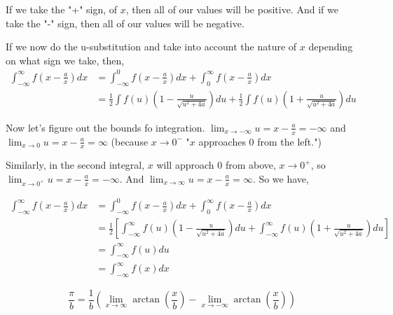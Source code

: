 If we take the "+" sign, of $x$, then all of our values will be positive.
And if we take the "-" sign, then all of our values will be negative.

If we now do the u-substitution and take into account the nature of $x$ depending on what sign we take, then,
\begin{align*}
\int_{-\infty}^{\infty} f\left(x - \frac{a}{x}\right) dx
    &= \int_{-\infty}^{0} f\left(x - \frac{a}{x}\right) dx + \int_{0}^{\infty} f\left(x - \frac{a}{x}\right) dx \\
&= \frac{1}{2} \int f(u) \left(1 - \frac{u}{\sqrt{u^2 + 4a}}\right) du
    + \frac{1}{2} \int f(u) \left(1 + \frac{u}{\sqrt{u^2 + 4a}}\right) du
\end{align*}

Now let's figure out the bounds fo integration.
$\lim_{x\rightarrow -\infty} u = x - \frac{a}{x} = -\infty$ and
$\lim_{x\rightarrow 0} u = x - \frac{a}{x} = \infty$ (because $x\rightarrow 0^-$ "$x$ approaches 0 from the left.")

Similarly, in the second integral, $x$ will approach $0$ from above, $x\rightarrow 0^+$, so
$\lim_{x\rightarrow 0^+} u = x - \frac{a}{x} = -\infty$.
And $\lim_{x\rightarrow \infty} u = x - \frac{a}{x} = \infty$.
So we have,

\begin{align*}
\int_{-\infty}^{\infty} f\left(x - \frac{a}{x}\right) dx
    &= \int_{-\infty}^{0} f\left(x - \frac{a}{x}\right) dx + \int_{0}^{\infty} f\left(x - \frac{a}{x}\right) dx \\
&= \frac{1}{2} \left[ \int_{-\infty}^{\infty} f(u) \left(1 - \frac{u}{\sqrt{u^2 + 4a}}\right) du
    + \int_{-\infty}^{\infty} f(u) \left(1 + \frac{u}{\sqrt{u^2 + 4a}}\right) du \right] \\
&= \int_{-\infty}^{\infty} f(u) du \\
&= \int_{-\infty}^{\infty} f(x) dx
\end{align*}

$$
\frac{\pi}{b} = \frac{1}{b}
    \left( \lim_{x\rightarrow\infty} \arctan\left(\frac{x}{b}\right) -
    \lim_{x\rightarrow -\infty} \arctan\left(\frac{x}{b}\right) \right)
$$